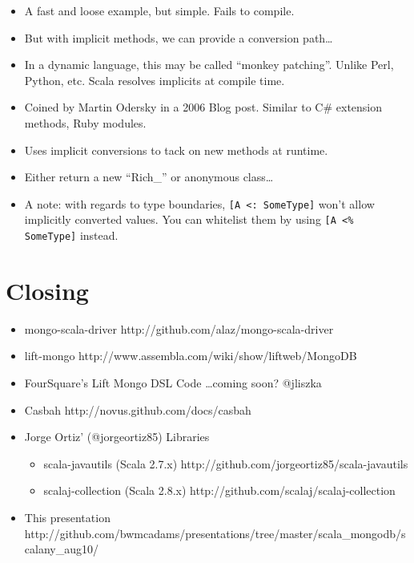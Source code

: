 \documentclass{beamer}
\newenvironment{itemizeframe}
               {\begin{frame}\startitemizeframe} 
               {\stopitemizeframe\end{frame}}
\newcommand\startitemizeframe{\begin{itemize}} \newcommand\stopitemizeframe{\end{itemize}}
\begin{document}
\begin{itemizeframe}
\begin{itemizeframe}
\begin{itemize}
            \item<2-> A fast and loose example, but simple.  Fails to compile.
            \item<3-> But with implicit methods, we can provide a conversion path\ldots
                
            \item<4-> In a dynamic language, this may be called ``monkey patching''. Unlike Perl, Python, etc. Scala resolves implicits at compile time.
        \end{itemize}
\end{itemizeframe}

\begin{itemizeframe}
    \frametitle{Pimp My Library}
    \item Coined by Martin Odersky in a 2006 Blog post.  Similar to C\# extension methods, Ruby modules.
    \item<2-> Uses implicit conversions to tack on new methods at runtime.
    \item<3-> Either return a new ``Rich\_'' or anonymous class\ldots
        
    \item<3-> A note: with regards to type boundaries, \texttt{[A <: SomeType]} won't allow implicitly converted values.  You can whitelist them by using \texttt{[A <\% SomeType]} instead.
\end{itemizeframe}
\section{Closing}
\begin{itemizeframe}
    \frametitle{Links}
    \item mongo-scala-driver {\scriptsize http://github.com/alaz/mongo-scala-driver}
    \item lift-mongo {\scriptsize http://www.assembla.com/wiki/show/liftweb/MongoDB}
    \item FourSquare's Lift Mongo DSL Code \ldots coming soon? {\scriptsize @jliszka}
    \item Casbah {\scriptsize http://novus.github.com/docs/casbah}
    \item Jorge Ortiz' ({\scriptsize @jorgeortiz85}) Libraries
        \begin{itemize}
            \item scala-javautils (Scala 2.7.x) {\scriptsize http://github.com/jorgeortiz85/scala-javautils}
            \item scalaj-collection (Scala 2.8.x) {\scriptsize http://github.com/scalaj/scalaj-collection}
        \end{itemize}
    \item This presentation {\scriptsize http://github.com/bwmcadams/presentations/tree/master/scala\_mongodb/scalany\_aug10/}
\end{itemizeframe}



\end{itemizeframe}
\end{document}
